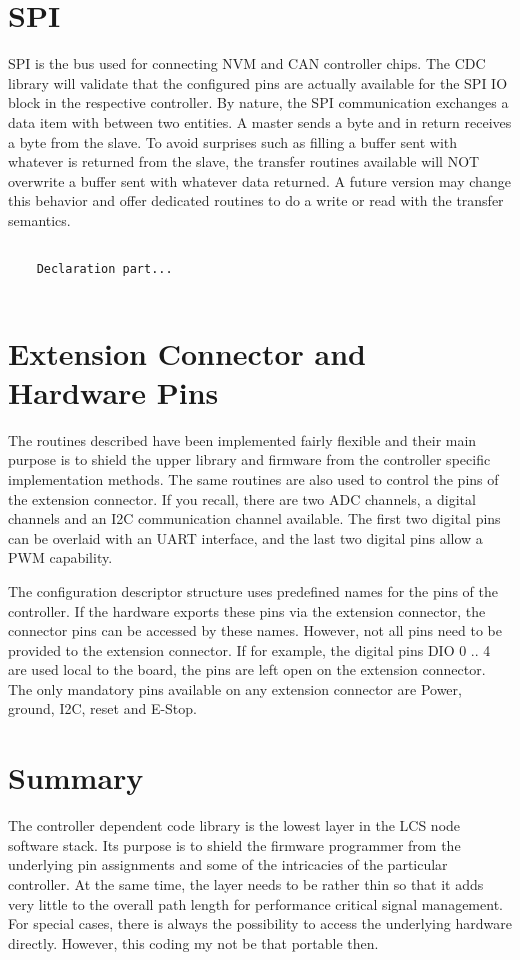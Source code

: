 \section{SPI}

SPI is the bus used for connecting NVM and CAN controller chips. The CDC library will validate that the configured pins are actually available for the SPI IO block in the respective controller. By nature, the SPI communication exchanges a data item with between two entities. A master sends a byte and in return receives a byte from the slave. To avoid surprises such as filling a buffer sent with whatever is returned from the slave, the transfer routines available will NOT overwrite a buffer sent with whatever data returned. A future version may change this behavior and offer dedicated routines to do a write or read with the transfer semantics.

\lstset{language=c++, style=codesnippetstyle}
\begin{lstlisting}
   
    Declaration part...
    
\end{lstlisting}

\section{Extension Connector and Hardware Pins}

The routines described have been implemented fairly flexible and their main purpose is to shield the upper library and firmware from the controller specific implementation methods. The same routines are also used to control the pins of the extension connector. If you recall, there are two ADC channels, a digital channels and an I2C communication channel available. The first two digital pins can be overlaid with an UART interface, and the last two digital pins allow a PWM capability.

The configuration descriptor structure uses predefined names for the pins of the controller. If the hardware exports these pins via the extension connector, the connector pins can be accessed by these names. However, not all pins need to be provided to the extension connector. If for example, the digital pins DIO 0 .. 4 are used local to the board, the pins are left open on the extension connector. The only mandatory pins available on any extension connector are Power, ground, I2C, reset and E-Stop.

\section{Summary}

The controller dependent code library is the lowest layer in the LCS node software stack. Its purpose is to shield the firmware programmer from the underlying pin assignments and some of the intricacies of the particular controller. At the same time, the layer needs to be rather thin so that it adds very little to the overall path length for performance critical signal management. For special cases, there is always the possibility to access the underlying hardware directly. However, this coding my not be that portable then.


